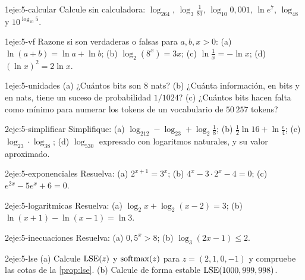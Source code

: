 \begin{ejercicio}{1}{eje:5-calcular}
Calcule sin calculadora: $\log_264$, $\log_3\frac1{81}$, $\log_{10}0{,}001$, $\ln e^7$, $\log_48$ y $10^{\log_{10}5}$.
\end{ejercicio}

\begin{ejercicio}{1}{eje:5-vf}
Razone si son verdaderas o falsas para $a,b,x>0$: (a) $\ln(a+b)=\ln a+\ln b$; (b) $\log_2(8^x)=3x$; (c) $\ln\frac1x=-\ln x$; (d) $(\ln x)^2=2\ln x$.
\end{ejercicio}

\begin{ejercicio}{1}{eje:5-unidades}
(a) ¿Cuántos bits son 8 nats? (b) ¿Cuánta información, en bits y en nats, tiene un suceso de probabilidad $1/1024$? (c) ¿Cuántos bits hacen falta como mínimo para numerar los tokens de un vocabulario de $50\,257$ tokens?
\end{ejercicio}

\begin{ejercicio}{2}{eje:5-simplificar}
Simplifique: (a) $\log_212-\log_23+\log_2\frac18$; (b) $\frac12\ln16+\ln\frac e4$; (c) $\log_23\cdot\log_38$; (d) $\log_530$ expresado con logaritmos naturales, y su valor aproximado.
\end{ejercicio}

\begin{ejercicio}{2}{eje:5-exponenciales}
Resuelva: (a) $2^{x+1}=3^x$; (b) $4^x-3\cdot2^x-4=0$; (c) $e^{2x}-5e^x+6=0$.
\end{ejercicio}

\begin{ejercicio}{2}{eje:5-logaritmicas}
Resuelva: (a) $\log_2x+\log_2(x-2)=3$; (b) $\ln(x+1)-\ln(x-1)=\ln3$.
\end{ejercicio}

\begin{ejercicio}{2}{eje:5-inecuaciones}
Resuelva: (a) $0{,}5^x>8$; (b) $\log_3(2x-1)\le2$.
\end{ejercicio}

\begin{ejercicio}{2}{eje:5-lse}
(a) Calcule $\operatorname{LSE}(z)$ y $\operatorname{softmax}(z)$ para $z=(2,1,0,-1)$ y compruebe las cotas de la \cref{prop:lse}. (b) Calcule de forma estable $\operatorname{LSE}(1000,999,998)$.
\end{ejercicio}

